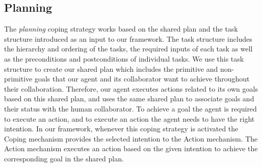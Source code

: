\documentclass[12pt]{report}
\begin{document}

\subsection{Planning}
The \textit{planning} coping strategy works based on the shared plan and the
task structure introduced as an input to our framework. The task structure
includes the hierarchy and ordering of the tasks, the required inputs of
each task as well as the preconditions and postconditions of individual tasks.
We use this task structure to create our shared plan which includes the
primitive and non-primitive goals that our agent and its collaborator want to
achieve throughout their collaboration. Therefore, our agent executes actions
related to its own goals based on this shared plan, and uses the same shared
plan to associate goals and their status with the human collaborator. To achieve
a goal the agent is required to execute an action, and to execute an action the
agent needs to have the right intention. In our framework, whenever this coping
strategy is activated the Coping mechanism provides the selected intention to
the Action mechanism. The Action mechanism executes an action based on the given
intention to achieve the corresponding goal in the shared plan.
\end{document}
